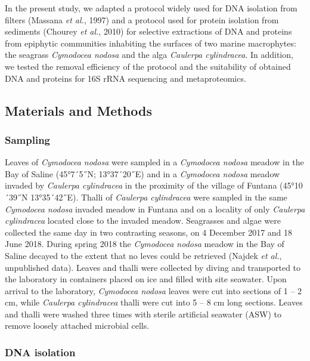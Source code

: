 \documentclass[12pt,]{article}
\begin{document}
In the present study, we adapted a protocol widely used for DNA
isolation from filters (Massana \emph{et al.}, 1997) and a protocol used
for protein isolation from sediments (Chourey \emph{et al.}, 2010) for
selective extractions of DNA and proteins from epiphytic communities
inhabiting the surfaces of two marine macrophytes: the seagrass
\emph{Cymodocea nodosa} and the alga \emph{Caulerpa cylindracea}. In
addition, we tested the removal efficiency of the protocol and the
suitability of obtained DNA and proteins for 16S rRNA sequencing and
metaproteomics.

\newpage

\subsection{Materials and Methods}\label{materials-and-methods}

\subsubsection{Sampling}\label{sampling}

Leaves of \emph{Cymodocea nodosa} were sampled in a \emph{Cymodocea
nodosa} meadow in the Bay of Saline (45°7´5˝N; 13°37´20˝E) and in a
\emph{Cymodocea nodosa} meadow invaded by \emph{Caulerpa cylindracea} in
the proximity of the village of Funtana (45°10´39˝N 13°35´42˝E). Thalli
of \emph{Caulerpa cylindracea} were sampled in the same \emph{Cymodocea
nodosa} invaded meadow in Funtana and on a locality of only
\emph{Caulerpa cylindracea} located close to the invaded meadow.
Seagrasses and algae were collected the same day in two contrasting
seasons, on 4 December 2017 and 18 June 2018. During spring 2018 the
\emph{Cymodocea nodosa} meadow in the Bay of Saline decayed to the
extent that no leves could be retrieved (Najdek \emph{et al.},
unpublished data). Leaves and thalli were collected by diving and
transported to the laboratory in containers placed on ice and filled
with site seawater. Upon arrival to the laboratory, \emph{Cymodocea
nodosa} leaves were cut into sections of 1 -- 2 cm, while \emph{Caulerpa
cylindracea} thalli were cut into 5 -- 8 cm long sections. Leaves and
thalli were washed three times with sterile artificial seawater (ASW) to
remove loosely attached microbial cells.

\subsubsection{DNA isolation}\label{dna-isolation}
\end{document}
